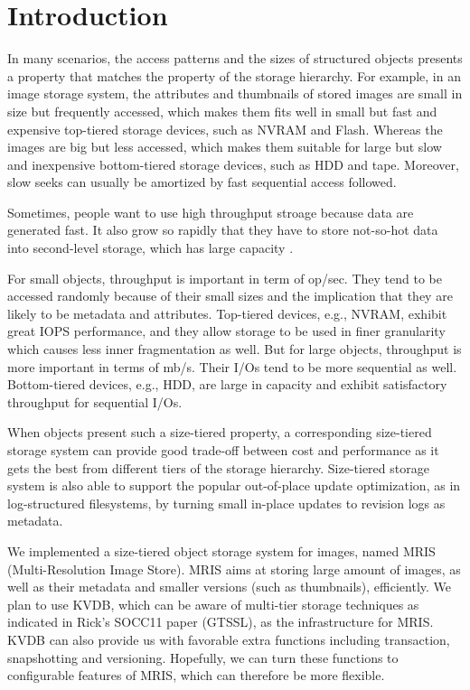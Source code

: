 \section{Introduction}
\label{intro}

In many scenarios, the access patterns and the sizes of structured
objects presents a property that matches the property of the storage
hierarchy. For example, in an image storage system, the attributes and
thumbnails of stored images are small in size but frequently accessed,
which makes them fits well in small but fast and expensive top-tiered
storage devices, such as NVRAM and Flash.  Whereas the images are big
but less accessed, which makes them suitable for large but slow and
inexpensive bottom-tiered storage devices, such as HDD and tape.
Moreover, slow seeks can usually be amortized by fast sequential
access followed.

Sometimes, people want to use high throughput stroage because data
are generated fast. It also grow so rapidly that they have to store
not-so-hot data into second-level storage, which has large capacity
\cite{level_lifetime}.

For small objects, throughput is important in term of op/sec. They
tend to be accessed randomly because of their small sizes and the
implication that they are likely to be metadata and attributes.
Top-tiered devices, e.g., NVRAM, exhibit great IOPS performance, and
they allow storage to be used in finer granularity which causes less
inner fragmentation as well. But for large objects, throughput is more
important in terms of mb/s. Their I/Os tend to be more sequential as
well. Bottom-tiered devices, e.g., HDD, are large in capacity and
exhibit satisfactory throughput for sequential I/Os. 

When objects present such a size-tiered property, a corresponding
size-tiered storage system can provide good trade-off between cost and
performance as it gets the best from different tiers of the storage
hierarchy. Size-tiered storage system is also able to support the
popular out-of-place update optimization, as in log-structured
filesystems, by turning small in-place updates to revision logs as
metadata.

We implemented a size-tiered object storage system for images, named
MRIS (Multi-Resolution Image Store). MRIS aims at storing large amount
of images, as well as their metadata and smaller versions (such as
thumbnails), efficiently. We plan to use KVDB, which can be aware of
multi-tier storage techniques as indicated in Rick's SOCC11 paper
(GTSSL), as the infrastructure for MRIS. KVDB can also provide us with
favorable extra functions including transaction, snapshotting and
versioning.  Hopefully, we can turn these functions to configurable
features of MRIS, which can therefore be more flexible.

